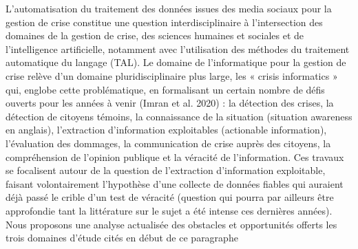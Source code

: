 L'automatisation du traitement des données issues des media sociaux pour la gestion de crise constitue une question interdisciplinaire à l'intersection des domaines de la gestion de crise, des sciences humaines et sociales et de l'intelligence artificielle, notamment avec l'utilisation des méthodes du traitement automatique du langage (TAL).
Le domaine de l'informatique pour la gestion de crise relève d'un domaine pluridisciplinaire plus large, les « crisis informatics » qui, englobe cette problématique, en formalisant un certain nombre de défis ouverts pour les années à venir (Imran et al. 2020) : la détection des
crises, la détection de citoyens témoins, la connaissance de la situation (situation awareness en anglais), l'extraction d'information exploitables (actionable information),
l'évaluation des dommages, la communication de crise auprès des citoyens, la compréhension de l'opinion publique et la véracité de l'information.
Ces travaux se focalisent autour de la question de l'extraction d'information exploitable, faisant volontairement l'hypothèse d'une collecte de données fiables
qui auraient déjà passé le crible d'un test de véracité (question qui pourra par
ailleurs être approfondie tant la littérature sur le sujet a été intense ces dernières
années).
Nous proposons une analyse actualisée des obstacles et opportunités offerts les
trois domaines d'étude cités en début de ce paragraphe

